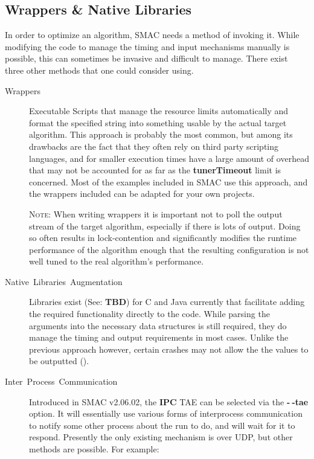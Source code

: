 \documentclass[manual.tex]{subfiles}
\begin{document}
\subsection{Wrappers \& Native Libraries}
\label{sec:exec-options}
In order to optimize an algorithm, SMAC needs a method of invoking it. While modifying the code
to manage the timing and input mechanisms manually is possible, this can sometimes be invasive and difficult to manage. There exist three other methods that one could consider using.

\begin{description}
\item [{Wrappers}] Executable Scripts that manage the resource limits automatically
and format the specified string into something usable by the actual
target algorithm. This approach is probably the most common, but among
its drawbacks are the fact that they often rely on third party scripting languages,
and for smaller execution times have a large amount of overhead that
may not be accounted for as far as the \textbf{tunerTimeout} limit is concerned. Most of the examples included in SMAC use this approach, and the wrappers included can be adapted for your own
projects.

\textsc{Note:} When writing wrappers it is important not to poll the output stream of the target algorithm, especially if there is lots of output. Doing so often results in lock-contention and significantly modifies the runtime performance of the algorithm enough that the resulting configuration is not well tuned to the real algorithm's performance.

\item [{Native~Libraries~Augmentation}] Libraries exist (See: \textbf{TBD}) for C and Java currently that facilitate adding the required functionality directly to the code. While
parsing the arguments into the necessary data structures is still required, they do manage the timing and output requirements in most cases. Unlike the previous approach however, certain crashes may not allow the the values to be outputted ().

\item [Inter~Process~Communication] Introduced in SMAC v2.06.02, the \textbf{IPC} TAE can be selected via the \textbf{-$~\!$-tae} option. It will essentially use various forms of interprocess communication to notify some other process about the run to do, and will wait for it to respond. Presently the only existing mechanism is over UDP, but other methods are possible. For example:


\end{description}
\end{document}
